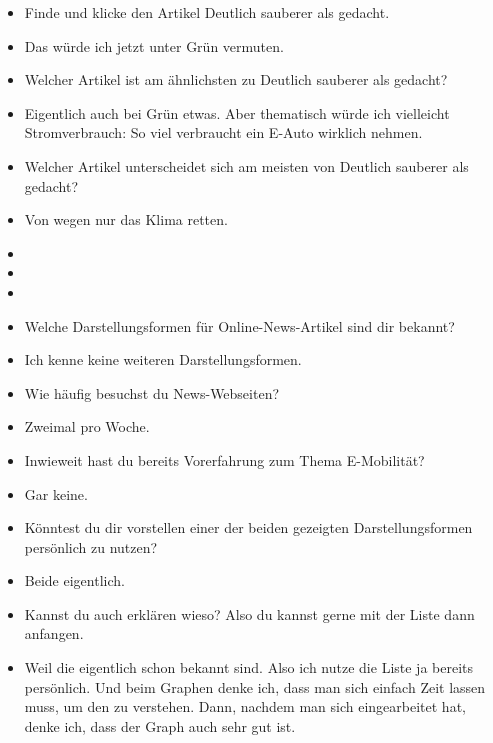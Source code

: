 {\begin{itemize}[]
            \item {} Finde und klicke den Artikel \flqq Deutlich sauberer als gedacht\frqq{}.
            \item {} Das würde ich jetzt unter Grün vermuten.
            \item {} Welcher Artikel ist am ähnlichsten zu \flqq Deutlich sauberer als gedacht\frqq{}?
            \item {} Eigentlich auch bei Grün etwas.
                  Aber thematisch würde ich vielleicht \flqq Stromverbrauch: So viel verbraucht ein E-Auto wirklich\frqq{} nehmen.
            \item {} Welcher Artikel unterscheidet sich am meisten von \flqq Deutlich sauberer als gedacht\frqq{}?
            \item {} \flqq Von wegen nur das Klima retten\frqq{}.
            \item {}
            \item {}
            \item {}
            \item {} Welche Darstellungsformen für Online-News-Artikel sind dir bekannt?
            \item {} Ich kenne keine weiteren Darstellungsformen.
            \item {} Wie häufig besuchst du News-Webseiten?
            \item {} Zweimal pro Woche.
            \item {} Inwieweit hast du bereits Vorerfahrung zum Thema E-Mobilität?
            \item {} Gar keine.
            \item {} Könntest du dir vorstellen einer der beiden gezeigten Darstellungsformen persönlich zu nutzen?
            \item {} Beide eigentlich.
            \item {} Kannst du auch erklären wieso? Also du kannst gerne mit der Liste dann anfangen.
            \item {} Weil die eigentlich schon bekannt sind.
                  Also ich nutze die Liste ja bereits persönlich.
                  Und beim Graphen denke ich, dass man sich einfach Zeit lassen muss, um den zu verstehen.
                  Dann, nachdem man sich eingearbeitet hat, denke ich, dass der Graph auch sehr gut ist.

\end{itemize}}
